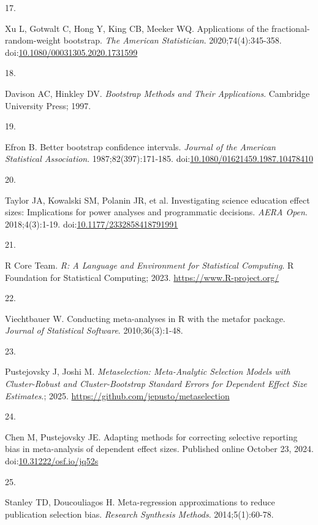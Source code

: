 \documentclass[
  american,
  man, donotrepeattitle,floatsintext]{apa7}
\newlength{\cslhangindent}
\newlength{\csllabelwidth}
\newenvironment{CSLReferences}[2] %
 {\begin{list}{}{%
  \setlength{\itemindent}{0pt}
  \setlength{\leftmargin}{0pt}
  \setlength{\parsep}{0pt}
  \ifodd #1
   \setlength{\leftmargin}{\cslhangindent}
   \setlength{\itemindent}{-1\cslhangindent}
  \fi
  \setlength{\itemsep}{#2\baselineskip}}}
 {\end{list}}
\newcommand{\CSLLeftMargin}[1]{\parbox[t]{\csllabelwidth}{\strut#1\strut}}
\newcommand{\CSLRightInline}[1]{\parbox[t]{\linewidth - \csllabelwidth}{\strut#1\strut}}
\begin{document}
\begin{CSLReferences}{0}{1}
\CSLLeftMargin{17. }%
\CSLRightInline{Xu L, Gotwalt C, Hong Y, King CB, Meeker WQ. Applications of the fractional-random-weight bootstrap. \emph{The American Statistician}. 2020;74(4):345-358. doi:\href{https://doi.org/10.1080/00031305.2020.1731599}{10.1080/00031305.2020.1731599}}

\CSLLeftMargin{18. }%
\CSLRightInline{Davison AC, Hinkley DV. \emph{Bootstrap Methods and Their Applications}. Cambridge University Press; 1997.}

\CSLLeftMargin{19. }%
\CSLRightInline{Efron B. Better bootstrap confidence intervals. \emph{Journal of the American Statistical Association}. 1987;82(397):171-185. doi:\href{https://doi.org/10.1080/01621459.1987.10478410}{10.1080/01621459.1987.10478410}}

\CSLLeftMargin{20. }%
\CSLRightInline{Taylor JA, Kowalski SM, Polanin JR, et al. Investigating science education effect sizes: Implications for power analyses and programmatic decisions. \emph{AERA Open}. 2018;4(3):1-19. doi:\href{https://doi.org/10.1177/2332858418791991}{10.1177/2332858418791991}}

\CSLLeftMargin{21. }%
\CSLRightInline{R Core Team. \emph{R: A Language and Environment for Statistical Computing}. R Foundation for Statistical Computing; 2023. \url{https://www.R-project.org/}}

\CSLLeftMargin{22. }%
\CSLRightInline{Viechtbauer W. {Conducting meta-analyses in R with the metafor package}. \emph{Journal of Statistical Software}. 2010;36(3):1-48.}

\CSLLeftMargin{23. }%
\CSLRightInline{Pustejovsky J, Joshi M. \emph{Metaselection: Meta-Analytic Selection Models with Cluster-Robust and Cluster-Bootstrap Standard Errors for Dependent Effect Size Estimates}.; 2025. \url{https://github.com/jepusto/metaselection}}

\CSLLeftMargin{24. }%
\CSLRightInline{Chen M, Pustejovsky JE. Adapting methods for correcting selective reporting bias in meta-analysis of dependent effect sizes. Published online October 23, 2024. doi:\href{https://doi.org/10.31222/osf.io/jq52s}{10.31222/osf.io/jq52s}}

\CSLLeftMargin{25. }%
\CSLRightInline{Stanley TD, Doucouliagos H. Meta-regression approximations to reduce publication selection bias. \emph{Research Synthesis Methods}. 2014;5(1):60-78.}


\end{CSLReferences}
\end{document}
